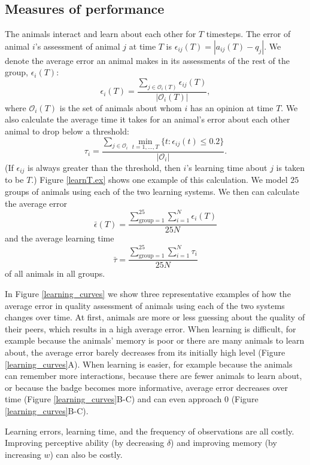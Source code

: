 \subsection{Measures of performance }
The animals interact and learn about each other for $T$ timesteps. The error of animal $i$'s assessment of animal $j$ at time $T$ is $\epsilon_{ij}(T)=|a_{ij}(T)-q_j|$. We denote the average error an animal makes in its assessments of the rest of the group, $\epsilon_i(T)$: 
\begin{equation*}
\epsilon_i(T) = \frac{\sum_{j\in \mathscr{O}_i(T)}\epsilon_{ij}(T)}{|\mathscr{O}_i(T)|},
\end{equation*}
where $\mathscr{O}_i(T)$ is the set of animals about whom $i$ has an opinion at time $T$.  
We also calculate the average time it takes for an animal's error about each other animal to drop below a threshold:
\begin{equation*}
\tau_{i} = \frac{\sum_{j\in\mathscr{O}_i} \min_{t=1,\dots,T}\{t: \epsilon_{ij}(t)\leq 0.2 \}}{|\mathscr{O}_i|} .
\end{equation*}
(If $\epsilon_{ij}$ is always greater than the threshold, then $i$'s learning time about $j$ is taken to be $T$.) Figure \ref{learnT.ex} shows one example of this calculation. We model $25$ groups of animals using each of the two learning systems. We then can calculate the average error $$\bar{\epsilon}(T)=\frac{\sum_{\text{group}=1}^{25}\sum_{i=1}^N\epsilon_i(T)}{25N}$$ and the average learning time $$\bar{\tau}=\frac{\sum_{\text{group}=1}^{25}\sum_{i=1}^N\tau_i}{25N}$$ of all animals in all groups. 

In Figure \ref{learning_curves} we show three representative examples of how the average error in quality assessment of animals using each of the two systems changes over time. At first, animals are more or less guessing about the quality of their peers, which results in a high average error. When learning is difficult, for example because the animals' memory is poor or there are many animals to learn about, the average error barely decreases from its initially high level (Figure \ref{learning_curves}A). When learning is easier, for example because the animals can remember more interactions, because there are fewer animals to learn about, or because the badge becomes more informative, average error decreases over time (Figure \ref{learning_curves}B-C) and can even approach $0$ (Figure \ref{learning_curves}B-C).  

Learning errors, learning time, and the frequency of observations are all costly. 
Improving  perceptive ability (by decreasing $\delta$) and improving memory (by increasing $w$) can also be costly. 

